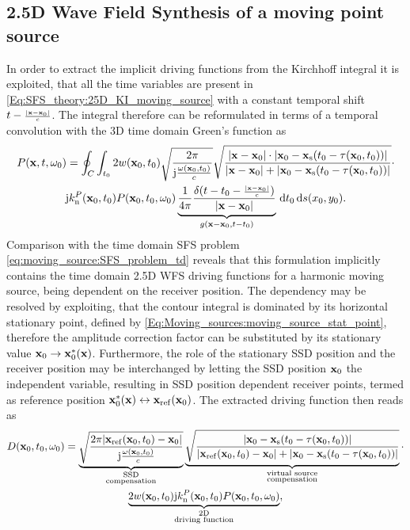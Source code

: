 \subsection{2.5D Wave Field Synthesis of a moving point source}

In order to extract the implicit driving functions from the Kirchhoff integral it is exploited, that all the time variables are present in \eqref{Eq:SFS_theory:25D_KI_moving_source}  with a constant temporal shift $t-{\scriptstyle \frac{|\mathbf{x}-\mathbf{x}_0|}{c} }$.
The integral therefore can be reformulated in terms of a temporal convolution with the 3D time domain Green's function as
\begin{multline}
P(\vx,t,\omega_0) =
\small
\oint_{C}  \int_{t_0} 2 w(\vxo,t_0 ) 
\sqrt{\frac{2\pi}{\ti\frac{\omega(\vxo,t_0)}{c}}}
\sqrt{\frac{|\vx-\vxo|\cdot|\vxo - \vxs(t_0-\tau(\vxo,t_0))|}{|\vx-\vxo|+|\vxo - \vxs(t_0-\tau(\vxo,t_0))|}} \cdot \\ %
 \ti k_{\mathrm{n}}^P(\vxo,t_0) P(\vxo,t_0,\omega_0)
\underbrace{\frac{1}{4\pi} \frac{ \delta(t-t_0- \Tret) }{|\vx-\vxo|}}_{g(\vx-\vxo,t-t_0)}
\, \td t_0 \, \td s(x_0, y_0).
\label{Eq:SFS_theory:25D_KI_moving_source_2}
\end{multline}
Comparison with the time domain SFS problem \eqref{eq:moving_source:SFS_problem_td} reveals that this formulation implicitly contains the time domain 2.5D WFS driving functions for a harmonic moving source, being dependent on the receiver position.
The dependency may be resolved by exploiting, that the contour integral is dominated by its horizontal stationary point, defined by \eqref{Eq:Moving_sources:moving_source_stat_point}, therefore the amplitude correction factor can be substituted by its stationary value $\mathbf{x}_0 \rightarrow \mathbf{x}_0^*(\mathbf{x})$.
Furthermore, the role of the stationary SSD position and the receiver position may be interchanged by letting the SSD position $\mathbf{x}_0$ the independent variable, resulting in SSD position dependent receiver points, termed as reference position $\mathbf{x}_0^*(\mathbf{x}) \leftrightarrow \mathbf{x}_{\mathrm{ref}}(\mathbf{x}_0)$.
The extracted driving function then reads as
\begin{multline}
D(\vxo,t_0,\omega_0) =
\underbrace{ \sqrt{\frac{2\pi |\vxref(\vxo,t_0)-\vxo|}{\ti\frac{\omega(\vxo,t_0)}{c}}}}_{{\substack{\text{SSD}\\\text{compensation}}}}
\underbrace{\sqrt{\frac{|\vxo - \vxs(t_0-\tau(\vxo,t_0))|}{|\vxref(\vxo,t_0)-\vxo|+|\vxo - \vxs(t_0-\tau(\vxo,t_0))|}}}_{{\substack{\text{virtual source}\\\text{compensation}}}} 
\cdot \\ %
\underbrace{2 w(\vxo,t_0) \ti k_{\mathrm{n}}^P(\vxo,t_0) P(\vxo,t_0,\omega_0)}_{\substack{\text{2D}\\\text{driving function}}},
\label{Eq:SFS_theory:25D_KI_moving_source}
\end{multline}
